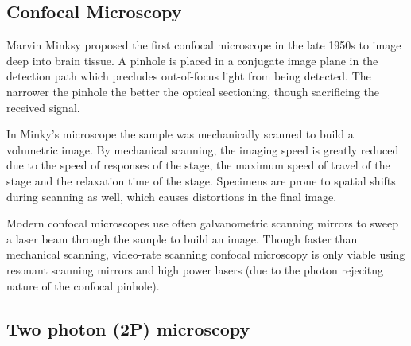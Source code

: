 \subsection{Confocal Microscopy}

Marvin Minksy proposed the first \gls{confocal microscope} in the late 1950s to image deep into brain tissue.
A pinhole is placed in a conjugate image plane in the detection path which precludes out-of-focus light from being detected.
The narrower the pinhole the better the optical sectioning, though sacrificing the received signal.

In Minky's microscope the sample was mechanically scanned to build a volumetric image.
By mechanical scanning, the imaging speed is greatly reduced due to the speed of responses of the stage, the maximum speed of travel of the stage and the relaxation time of the stage.
Specimens are prone to spatial shifts during scanning as well, which causes distortions in the final image.

Modern \gls{confocal microscope}s use often \gls{galvanometric scanning mirrors} to sweep a laser beam through the sample to build an image.
Though faster than mechanical scanning, video-rate scanning confocal microscopy is only viable using \gls{resonant scanning mirrors} and high power lasers (due to the photon rejecitng nature of the confocal pinhole).

%

\subsection{Two photon (2P) microscopy}\label{sec:2p}


